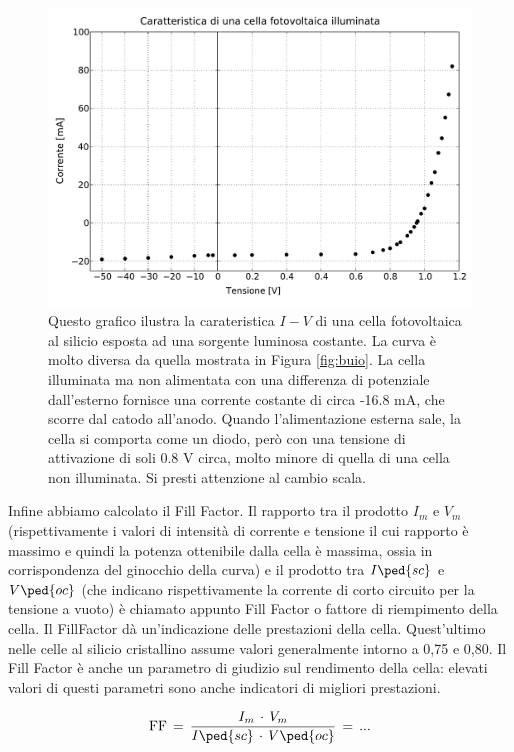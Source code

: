 \begin{figure}
    \includegraphics[scale=0.53]{luce.pdf}
    \caption{Questo grafico ilustra la carateristica $I-V$ di una cella fotovoltaica al silicio esposta ad una sorgente luminosa costante. La curva è molto diversa da quella mostrata
        in Figura \ref{fig:buio}. La cella illuminata ma non alimentata con una differenza di potenziale dall'esterno fornisce una corrente costante di circa -16.8 mA, che scorre
        dal catodo all'anodo. Quando l'alimentazione esterna sale, la cella si comporta come un diodo, però con una tensione di attivazione di soli 0.8 V circa, molto minore di quella
        di una cella non illuminata. Si presti attenzione al cambio scala.}
    \label{fig:luce}
\end{figure}

Infine abbiamo calcolato il Fill Factor. Il rapporto tra il prodotto $I_m$ e $V_m$ (rispettivamente i valori di intensità di corrente e tensione il cui rapporto è massimo e quindi la potenza ottenibile dalla cella è massima, ossia in corrispondenza del ginocchio della curva) e il prodotto tra $I\ped{sc}$ e $V\ped{oc}$ (che indicano rispettivamente la corrente di corto circuito per la tensione a vuoto) è chiamato appunto Fill Factor o fattore di riempimento della cella.
Il FillFactor dà un’indicazione delle prestazioni della cella.
Quest’ultimo nelle celle al silicio cristallino assume valori generalmente intorno a 0,75 e 0,80. Il Fill Factor è anche un parametro di giudizio sul rendimento della cella: elevati valori di questi parametri sono anche indicatori di migliori prestazioni.

\begin{equation}
	\text{FF} \,=\, \frac{I_m\,\cdot\,V_m}{I\ped{sc}\,\cdot\,V\ped{oc}} \,=\, ...
\end{equation}

